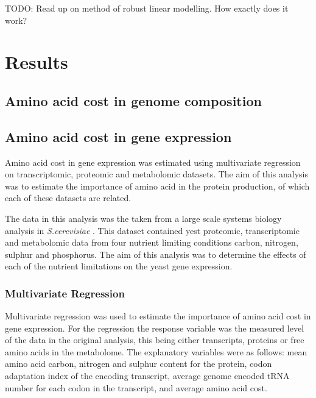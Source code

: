 TODO: Read up on method of robust linear modelling. How exactly does it work?

\clearpage

\section{Results}

\subsection{Amino acid cost in genome composition}

\subsection{Amino acid cost in gene expression}

Amino acid cost in gene expression was estimated using multivariate regression on transcriptomic, proteomic and metabolomic datasets. The aim of this analysis was to estimate the importance of amino acid in the protein production, of which each of these datasets are related.

The data in this analysis was the taken from a large scale systems biology analysis in \emph{S.cerevisiae} \cite{castrillo2007}. This dataset contained yest proteomic, transcriptomic and metabolomic data from four nutrient limiting conditions carbon, nitrogen, sulphur and phosphorus. The aim of this analysis was to determine the effects of each of the nutrient limitations on the yeast gene expression.

\subsubsection{Multivariate Regression}

Multivariate regression was used to estimate the importance of amino acid cost in gene expression. For the regression the response variable was the measured level of the data in the original analysis, this being either transcripts, proteins or free amino acids in the metabolome. The explanatory variables were as follows: mean amino acid carbon, nitrogen and sulphur content for the protein, codon adaptation index of the encoding transcript, average genome encoded tRNA number for each codon in the transcript, and average amino acid cost.

